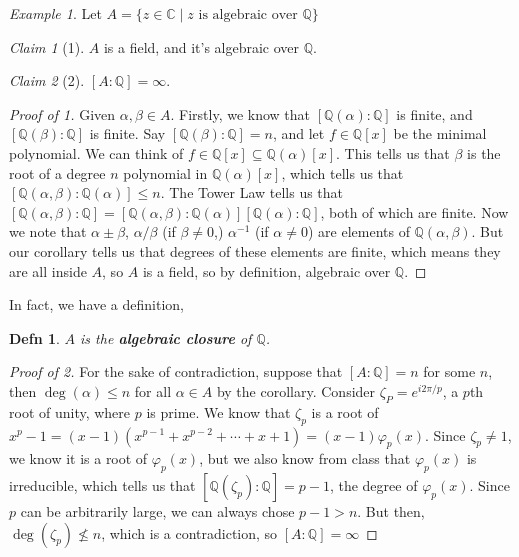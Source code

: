 \documentclass[12pt]{article}
\def\phi{\varphi}
\def\Q{{\mathbb Q}}
\def\C{{\mathbb C}}
\newtheorem{definition}{Defn}
\theoremstyle{remark}
\theoremstyle{remark}
\newtheorem{claim}{Claim}
\theoremstyle{remark}
\newtheorem{example}{Example}
\theoremstyle{remark}
\theoremstyle{remark}
\begin{document}
\begin{example}
  Let $A = \{z \in \C \mid \text{$z$ is algebraic over $\Q$}\}$

  \begin{claim}[1]
    $A$ is a field, and it's algebraic over $\Q$.
  \end{claim}

  \begin{claim}[2]
    $[A : \Q] = \infty$.
  \end{claim}

  \begin{proof}[Proof of 1]
    Given $\alpha, \beta \in A$. Firstly, we know that $[\Q(\alpha) : \Q]$ is
    finite, and $[\Q(\beta) : \Q]$ is finite. Say $[\Q(\beta) : \Q] = n$, and
    let $f \in \Q[x]$ be the minimal polynomial. We can think of $f \in \Q[x]
    \subseteq \Q(\alpha)[x]$. This tells us that $\beta$ is the root of a
    degree $n$ polynomial in $\Q(\alpha)[x]$, which tells us that
    $[\Q(\alpha, \beta) : \Q(\alpha)] \le n$. The Tower Law tells us that
    $[\Q(\alpha, \beta) : \Q] = [\Q(\alpha, \beta) : \Q(\alpha)][\Q(\alpha) :
    \Q]$, both of which are finite. Now we note that $\alpha \pm \beta$, $\alpha
    / \beta$ (if $\beta \ne 0$,) $\alpha^{-1}$ (if $\alpha \ne 0$) are elements
    of $\Q(\alpha, \beta)$. But our corollary tells us that degrees of these
    elements are finite, which means they are all inside $A$, so $A$ is a field,
    so by definition, algebraic over $\Q$.
  \end{proof}

  In fact, we have a definition,
  
  \begin{definition}
    $A$ is the {\bf algebraic closure} of $\Q$.
  \end{definition}

  \begin{proof}[Proof of 2]
    For the sake of contradiction, suppose that $[A : \Q] = n$ for some $n$,
    then $\deg(\alpha) \le n$ for all $\alpha \in A$ by the corollary. Consider
    $\zeta_P = e^{i 2 \pi / p}$, a $p$th root of unity, where $p$ is prime. We
    know that $\zeta_p$ is a root of $x^p - 1 = (x - 1)(x^{p - 1} + x^{p - 2} +
    \cdots + x + 1) = (x - 1) \phi_p(x)$. Since $\zeta_p \ne 1$, we know it is a
    root of $\phi_p(x)$, but we also know from class that $\phi_p(x)$ is
    irreducible, which tells us that $[\Q(\zeta_p) : \Q] = p - 1$, the degree of
    $\phi_p(x)$. Since $p$ can be arbitrarily large, we can always chose $p - 1
    > n$. But then, $\deg(\zeta_p) \not\le n$, which is a contradiction, so $[A
    : \Q] = \infty$
  \end{proof}
\end{example}
\end{document}
